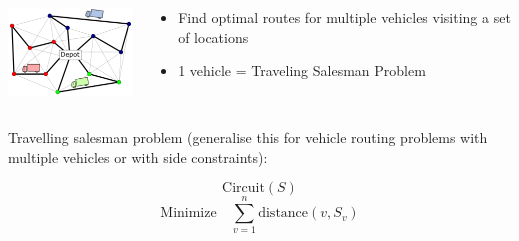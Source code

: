 \documentclass{cons-beamer}
\begin{document}
\begin{frame}
  \begin{example}

    \begin{columns}
      \begin{column}{0.4\textwidth}        
        \centering
        \includegraphics[width=40mm]{images/VRP.png} \\
      \end{column}
      \begin{column}{0.6\textwidth}        
        \begin{itemize}
          \item Find optimal routes for multiple vehicles visiting a set of locations
          \item 1 vehicle = Traveling Salesman Problem
        \end{itemize}
      \end{column}
    \end{columns}
  \end{example}

    Travelling salesman problem (generalise this for vehicle
    routing problems with multiple vehicles or with side constraints):

    \[
    \text{Circuit}(S)
    \]
    \[
    \text{Minimize} \quad \sum_{v=1}^{n} \text{distance}(v, S_v)
    \]   
\end{frame}
\end{document}

